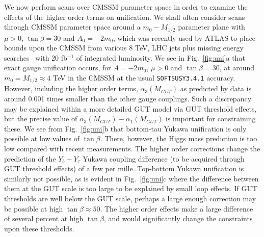 \documentclass[final,3p,times,pdflatex]{elsarticle}
\begin{document}
We now perform scans over CMSSM parameter space in order to examine the
effects of the higher order terms on unification. 
We shall often consider scans through CMSSM parameter space
around a 
$m_0-M_{1/2}$ parameter plane with $\mu>0$, $\tan \beta=30$ and $A_0=-2m_0$,
which was 
recently used by ATLAS to place bounds upon the CMSSM from various 8
TeV,  LHC jets plus missing energy
searches~\cite{Aad:2014wea} with 20 fb$^{-1}$ of
integrated luminosity.  
We see in Fig.~\ref{fig:uni}a that exact gauge unification occurs, for
$A=-2m_0$, $\mu>0$ and $\tan \beta=30$, at around $m_0=M_{1/2}\approx 4$ TeV
in the CMSSM at the usual {\tt SOFTSUSY3.4.1} accuracy. However, including the
higher order terms, $\alpha_3(M_{GUT})$ 
as predicted by data is around 0.001 times smaller than the other gauge
couplings. Such a discrepancy may be explained within a more detailed GUT model
via GUT threshold effects, but the precise value of
$\alpha_3(M_{GUT})-\alpha_1(M_{GUT})$ is important for constraining these. 
We see from Fig.~\ref{fig:uni}b that bottom-tau Yukawa unification is only
possible at low values of $\tan \beta$. There, however, the Higgs mass
prediction is too low compared with recent measurements. The higher order
corrections change the prediction of the $Y_b-Y_\tau$ Yukawa coupling
difference (to be  
acquired through GUT threshold effects) of a few per mille. Top-bottom Yukawa
unification is similarly not possible, as is evident in Fig.~\ref{fig:uni}c
where the difference between them at the GUT scale is too large to be
explained by small loop effects. If GUT thresholds are well below the GUT
scale, perhaps a large enough correction may be possible at high $\tan \beta
\approx 50$. The higher order
effects make a large difference of several percent at high $\tan \beta$, and 
would significantly change the constraints upon these thresholds. 
\end{document}
